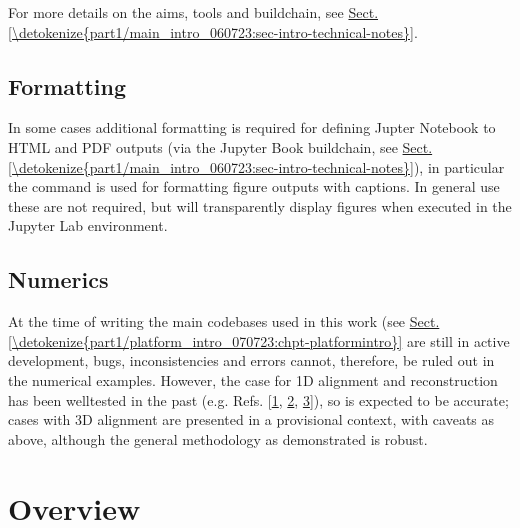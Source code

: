 \documentclass[letterpaper,table,10pt,english]{jupyterBook}
\begin{document}
\sphinxAtStartPar
For more details on the aims, tools and build\sphinxhyphen{}chain, see \hyperref[\detokenize{part1/main_intro_060723:sec-intro-technical-notes}]{Sect.\@ \ref{\detokenize{part1/main_intro_060723:sec-intro-technical-notes}}}.


\section{Formatting}
\label{\detokenize{frontmatter/book_versions_note:formatting}}
\sphinxAtStartPar
In some cases additional formatting is required for defining Jupter Notebook to HTML and PDF outputs (via the Jupyter Book build\sphinxhyphen{}chain, see \hyperref[\detokenize{part1/main_intro_060723:sec-intro-technical-notes}]{Sect.\@ \ref{\detokenize{part1/main_intro_060723:sec-intro-technical-notes}}}), in particular the  command is used for formatting figure outputs with captions. In general use these are not required, but will transparently display figures when executed in the Jupyter Lab environment.


\section{Numerics}
\label{\detokenize{frontmatter/book_versions_note:numerics}}\label{\detokenize{frontmatter/book_versions_note:sec-numerics-disclaimer}}
\sphinxAtStartPar
At the time of writing the main code\sphinxhyphen{}bases used in this work (see \hyperref[\detokenize{part1/platform_intro_070723:chpt-platformintro}]{Sect.\@ \ref{\detokenize{part1/platform_intro_070723:chpt-platformintro}}} are still in active development, bugs, inconsistencies and errors cannot, therefore, be ruled out in the numerical examples. However, the case for 1D alignment and reconstruction has been well\sphinxhyphen{}tested in the past (e.g. Refs. {[}\hyperlink{cite.backmatter/bibliography:id774}{1}, \hyperlink{cite.backmatter/bibliography:id683}{2}, \hyperlink{cite.backmatter/bibliography:id684}{3}{]}), so is expected to be accurate; cases with 3D alignment are presented in a provisional context, with caveats as above, although the general methodology as demonstrated is robust.

\sphinxstepscope


\chapter{Overview}
\label{\detokenize{frontmatter/overview_270122:overview}}\label{\detokenize{frontmatter/overview_270122::doc}}
\end{document}
